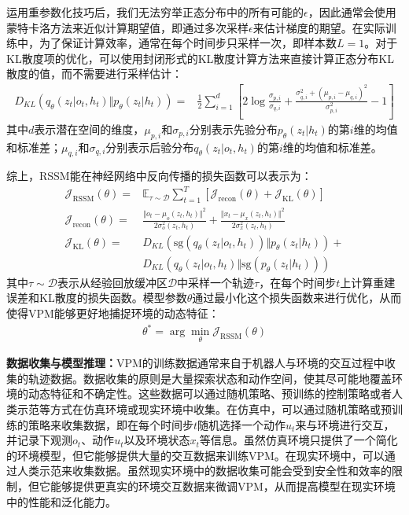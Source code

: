 \newpage
运用重参数化技巧后，我们无法穷举正态分布中的所有可能的$\epsilon$，因此通常会使用蒙特卡洛方法来近似计算期望值，即通过多次采样$\epsilon$来估计梯度的期望。在实际训练中，为了保证计算效率，通常在每个时间步只采样一次，即样本数$L=1$。对于KL散度项的优化，可以使用封闭形式的KL散度计算方法来直接计算正态分布KL散度的值，而不需要进行采样估计：
\begin{equation}
\begin{aligned}
    D_{KL}\left(q_{\theta}(z_t\vert o_t, h_t) \Vert p_{\theta}(z_t\vert h_t)\right) =& \frac{1}{2} \sum_{i=1}^d \left[ 2\log\frac{\sigma_{p,i}}{\sigma_{q,i}} + \frac{\sigma^2_{q,i}+(\mu_{p,i} - \mu_{q,i})^2}{\sigma^2_{p,i}} - 1 \right]
\end{aligned}
\end{equation}
其中$d$表示潜在空间的维度，$\mu_{p,i}$和$\sigma_{p,i}$分别表示先验分布$p_{\theta}(z_t\vert h_t)$的第$i$维的均值和标准差；$\mu_{q,i}$和$\sigma_{q,i}$分别表示后验分布$q_{\theta}(z_t\vert o_t, h_t)$的第$i$维的均值和标准差。

综上，RSSM能在神经网络中反向传播的损失函数可以表示为：
\begin{equation}
\begin{aligned}
    \mathcal{J}_{\text{RSSM}}(\theta) =& \mathbb{E}_{\tau\sim\mathcal{D}} \sum_{t=1}^T [\mathcal{J}_{\text{recon}}(\theta) + \mathcal{J}_{\text{KL}}(\theta)] \\
    \mathcal{J}_{\text{recon}}(\theta) =& \frac{\Vert o_t - \mu_o(z_t, h_t) \Vert^2}{2 \sigma_o^2(z_t, h_t)}  + \frac{\Vert x_t - \mu_x(z_t, h_t) \Vert^2}{2 \sigma_x^2(z_t, h_t)} \\
    \mathcal{J}_{\text{KL}}(\theta) =& D_{KL}\left(\text{sg}(q_{\theta}(z_t\vert o_t, h_t)) \Vert p_{\theta}(z_t\vert h_t)\right) + \\
    & D_{KL}\left(q_{\theta}(z_t\vert o_t, h_t) \Vert \text{sg}(p_{\theta}(z_t\vert h_t))\right)
\end{aligned}
\end{equation}
其中$\tau\sim\mathcal{D}$表示从经验回放缓冲区$\mathcal{D}$中采样一个轨迹$\tau$，在每个时间步$t$上计算重建误差和KL散度的损失函数。模型参数$\theta$通过最小化这个损失函数来进行优化，从而使得VPM能够更好地捕捉环境的动态特征：
\begin{equation}
\begin{aligned}
    \theta^* = \arg\min_{\theta} \mathcal{J}_{\text{RSSM}}(\theta)
\end{aligned}
\end{equation}

\textbf{数据收集与模型推理：}VPM的训练数据通常来自于机器人与环境的交互过程中收集的轨迹数据。数据收集的原则是大量探索状态和动作空间，使其尽可能地覆盖环境的动态特征和不确定性。这些数据可以通过随机策略、预训练的控制策略或者人类示范等方式在仿真环境或现实环境中收集。在仿真中，可以通过随机策略或预训练的策略来收集数据，即在每个时间步$t$随机选择一个动作$u_t$来与环境进行交互，并记录下观测$o_t$、动作$u_t$以及环境状态$x_t$等信息。虽然仿真环境只提供了一个简化的环境模型，但它能够提供大量的交互数据来训练VPM。在现实环境中，可以通过人类示范来收集数据。虽然现实环境中的数据收集可能会受到安全性和效率的限制，但它能够提供更真实的环境交互数据来微调VPM，从而提高模型在现实环境中的性能和泛化能力。

